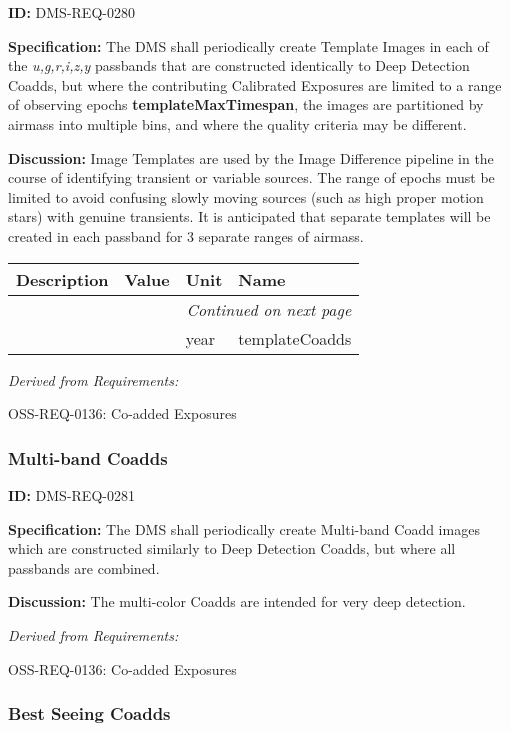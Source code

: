 \documentclass[SE,toc,lsstdraft]{lsstdoc}
\makeatletter
\newcommand{\paramname}[1]{\hspace{0pt}#1}
\newcommand{\unitname}[1]{\hspace{0pt}#1}
\newenvironment{parameters}[0]{%
\setlength\LTleft{0pt}
\setlength\LTright{\fill}
\begin{small}
\begin{longtable}[]{|p{0.5\textwidth}|l|p{0.6in}|p{1.74in}@{}|}

\hline \textbf{Description} & \textbf{Value} & \textbf{Unit} & \textbf{Name} \\ \hline
\endhead

\hline \multicolumn{4}{r}{\emph{Continued on next page}} \\
\endfoot

\hline\hline
\endlastfoot
}{%
\hline
\end{longtable}
\end{small}
}
\makeatother
\begin{document}
\label{DMS-REQ-0280}
\textbf{ID:} DMS-REQ-0280

\textbf{Specification:} The DMS shall periodically create Template Images in each of the \textit{u,g,r,i,z,y} passbands that are constructed identically to Deep Detection Coadds, but where the contributing Calibrated Exposures are limited to a range of observing epochs \textbf{templateMaxTimespan}, the images are partitioned by airmass into multiple bins, and where the quality criteria may be different.

\textbf{Discussion: }Image Templates are used by the Image Difference pipeline in the course of identifying transient or variable sources. The range of epochs must be limited to avoid confusing slowly moving sources (such as high proper motion stars) with genuine transients. It is anticipated that separate templates will be created in each passband for 3 separate ranges of airmass.



\begin{parameters}

&

&
\unitname{%
year
}
&
\paramname{%
templateCoadds
} \\\hline
\end{parameters}




\emph{Derived from Requirements:}

OSS-REQ-0136:
Co-added Exposures \newline


\subsubsection{Multi-band Coadds}

\label{DMS-REQ-0281}
\textbf{ID:} DMS-REQ-0281

\textbf{Specification:} The DMS shall periodically create Multi-band Coadd images which are constructed similarly to Deep Detection Coadds, but where all passbands are combined.

\textbf{Discussion: }The multi-color Coadds are intended for very deep detection.




\emph{Derived from Requirements:}

OSS-REQ-0136:
Co-added Exposures \newline


\subsubsection{Best Seeing Coadds}
\end{document}
